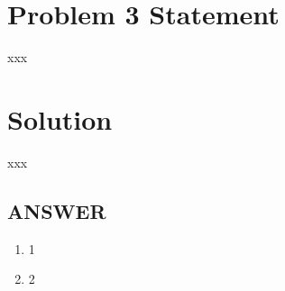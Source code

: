 \section*{Problem 3 Statement}

xxx

\section*{Solution}

xxx

\vfill
\subsection*{ANSWER}
\begin{enumerate}
    \item 1
    \item 2
\end{enumerate}